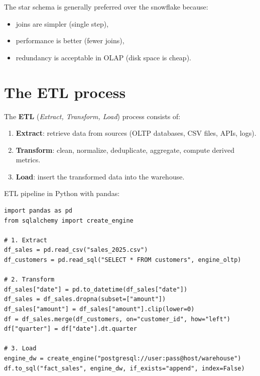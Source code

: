 \begin{attention}
The star schema is generally preferred over the snowflake because:
\begin{itemize}
  \item joins are simpler (single step),
  \item performance is better (fewer joins),
  \item redundancy is acceptable in OLAP (disk space is cheap).
\end{itemize}
\end{attention}

\section{The ETL process}

\begin{definition}[ETL]
The \textbf{ETL} (\emph{Extract, Transform, Load}) process consists of:
\begin{enumerate}
  \item \textbf{Extract}: retrieve data from sources (OLTP databases,
        CSV files, APIs, logs).
  \item \textbf{Transform}: clean, normalize, deduplicate, aggregate,
        compute derived metrics.
  \item \textbf{Load}: insert the transformed data into the warehouse.
\end{enumerate}
\end{definition}

\begin{example}
ETL pipeline in Python with pandas:
\begin{verbatim}
import pandas as pd
from sqlalchemy import create_engine

# 1. Extract
df_sales = pd.read_csv("sales_2025.csv")
df_customers = pd.read_sql("SELECT * FROM customers", engine_oltp)

# 2. Transform
df_sales["date"] = pd.to_datetime(df_sales["date"])
df_sales = df_sales.dropna(subset=["amount"])
df_sales["amount"] = df_sales["amount"].clip(lower=0)
df = df_sales.merge(df_customers, on="customer_id", how="left")
df["quarter"] = df["date"].dt.quarter

# 3. Load
engine_dw = create_engine("postgresql://user:pass@host/warehouse")
df.to_sql("fact_sales", engine_dw, if_exists="append", index=False)
\end{verbatim}
\end{example}

